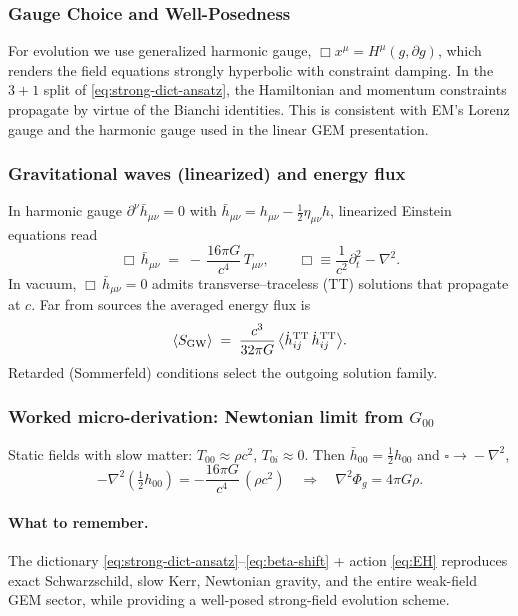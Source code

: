 \subsubsection{Gauge Choice and Well-Posedness}
\label{sec:gauge}
For evolution we use generalized harmonic gauge, $\Box x^\mu=H^\mu(g,\partial g)$, which renders the field equations strongly hyperbolic with constraint damping. In the $3\!+\!1$ split of \eqref{eq:strong-dict-ansatz}, the Hamiltonian and momentum constraints propagate by virtue of the Bianchi identities. This is consistent with EM’s Lorenz gauge and the harmonic gauge used in the linear GEM presentation.

\subsubsection{Gravitational waves (linearized) and energy flux}
\label{sec:gw-linear}
In harmonic gauge $\partial^\nu \bar h_{\mu\nu}=0$ with $\bar h_{\mu\nu}=h_{\mu\nu}-\tfrac12\eta_{\mu\nu}h$, linearized Einstein equations read
\begin{equation}
\Box\,\bar h_{\mu\nu} \;=\; -\,\frac{16\pi G}{c^4}\,T_{\mu\nu},
\qquad \Box \equiv \frac{1}{c^2}\partial_t^2-\nabla^2 .
\label{eq:gw-wave}
\end{equation}
In vacuum, $\Box\,\bar h_{\mu\nu}=0$ admits transverse–traceless (TT) solutions that propagate at $c$. Far from sources the averaged energy flux is
\begin{equation}
\langle S_{\rm GW}\rangle \;=\; \frac{c^3}{32\pi G}\,\big\langle \dot h^{\rm TT}_{ij}\,\dot h^{\rm TT}_{ij}\big\rangle .
\label{eq:gw-flux}
\end{equation}
Retarded (Sommerfeld) conditions select the outgoing solution family.

\subsubsection{Worked micro-derivation: Newtonian limit from $G_{00}$}
\label{sec:newtonian-worked}
Static fields with slow matter: $T_{00}\approx \rho c^2$, $T_{0i}\!\approx\!0$. Then $\bar h_{00}=\tfrac12 h_{00}$ and $\square\!\to\! -\nabla^2$,
\[
-\nabla^2\!\left(\tfrac12 h_{00}\right)=-\frac{16\pi G}{c^4}\,(\rho c^2)
\quad\Rightarrow\quad
\nabla^2 \Phi_g = 4\pi G \rho.
\]
\paragraph{What to remember.}
The dictionary \eqref{eq:strong-dict-ansatz}--\eqref{eq:beta-shift} + action \eqref{eq:EH} reproduces exact Schwarzschild, slow Kerr, Newtonian gravity, and the entire weak-field GEM sector, while providing a well-posed strong-field evolution scheme.

